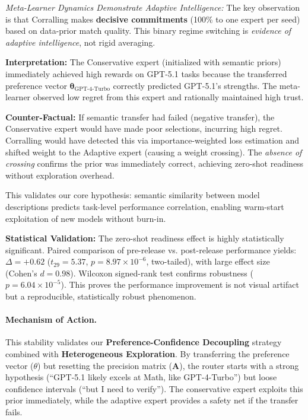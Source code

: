 \textit{Meta-Learner Dynamics Demonstrate Adaptive Intelligence:} The key observation is that Corralling makes \textbf{decisive commitments} (100\% to one expert per seed) based on data-prior match quality. This binary regime switching is \textit{evidence of adaptive intelligence}, not rigid averaging. 

\textbf{Interpretation:} The Conservative expert (initialized with semantic priors) immediately achieved high rewards on GPT-5.1 tasks because the transferred preference vector $\boldsymbol{\theta}_{\text{GPT-4-Turbo}}$ correctly predicted GPT-5.1's strengths. The meta-learner observed low regret from this expert and rationally maintained high trust. 

\textbf{Counter-Factual:} If semantic transfer had failed (negative transfer), the Conservative expert would have made poor selections, incurring high regret. Corralling would have detected this via importance-weighted loss estimation and shifted weight to the Adaptive expert (causing a weight crossing). The \textit{absence of crossing} confirms the prior was immediately correct, achieving zero-shot readiness without exploration overhead.

This validates our core hypothesis: semantic similarity between model descriptions predicts task-level performance correlation, enabling warm-start exploitation of new models without burn-in.

\textbf{Statistical Validation:} The zero-shot readiness effect is highly statistically significant. Paired comparison of pre-release vs. post-release performance yields: $\Delta = +0.62$ ($t_{29} = 5.37$, $p = 8.97 \times 10^{-6}$, two-tailed), with large effect size (Cohen's $d = 0.98$). Wilcoxon signed-rank test confirms robustness ($p = 6.04 \times 10^{-5}$). This proves the performance improvement is not visual artifact but a reproducible, statistically robust phenomenon.

\paragraph{Mechanism of Action.} 
This stability validates our \textbf{Preference-Confidence Decoupling} strategy combined with \textbf{Heterogeneous Exploration}. By transferring the preference vector ($\theta$) but resetting the precision matrix ($\mathbf{A}$), the router starts with a strong hypothesis (``GPT-5.1 likely excels at Math, like GPT-4-Turbo'') but loose confidence intervals (``but I need to verify''). The conservative expert exploits this prior immediately, while the adaptive expert provides a safety net if the transfer fails.

